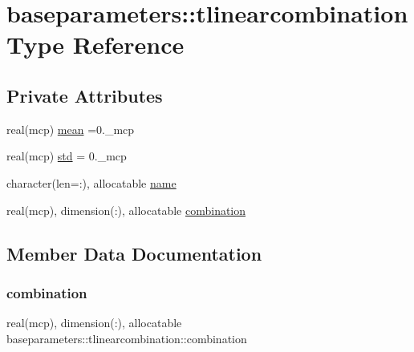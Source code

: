\hypertarget{structbaseparameters_1_1tlinearcombination}{}\section{baseparameters\+:\+:tlinearcombination Type Reference}
\label{structbaseparameters_1_1tlinearcombination}
\subsection*{Private Attributes}
\begin{DoxyCompactItemize}
\item 
real(mcp) \mbox{\hyperlink{structbaseparameters_1_1tlinearcombination_a4938675afa8e1328b77dc86f770d4b7c}{mean}} =0.\+\_\+mcp
\item 
real(mcp) \mbox{\hyperlink{structbaseparameters_1_1tlinearcombination_aacb01ad751251b105591f8d50164e1a2}{std}} = 0.\+\_\+mcp
\item 
character(len=\+:), allocatable \mbox{\hyperlink{structbaseparameters_1_1tlinearcombination_aa9a9ba3d0c13c57bee63cbb0dd8532e4}{name}}
\item 
real(mcp), dimension(\+:), allocatable \mbox{\hyperlink{structbaseparameters_1_1tlinearcombination_acfd3c78dc45e668616c480904f2db841}{combination}}
\end{DoxyCompactItemize}


\subsection{Member Data Documentation}
\mbox{\label{structbaseparameters_1_1tlinearcombination_acfd3c78dc45e668616c480904f2db841}} 
\subsubsection{\texorpdfstring{combination}{combination}}
{\footnotesize\ttfamily real(mcp), dimension(\+:), allocatable baseparameters\+::tlinearcombination\+::combination\hspace{0.3cm}{\ttfamily [private]}}

\mbox{\label{structbaseparameters_1_1tlinearcombination_a4938675afa8e1328b77dc86f770d4b7c}} 
